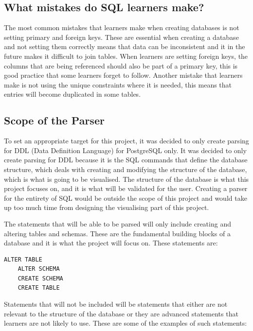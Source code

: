 \subsection{What mistakes do SQL learners make?}

The most common mistakes that learners make when creating databases is not setting primary and foreign keys. These are essential when creating a database and not setting them correctly means that data can be inconsistent and it in the future makes it difficult to join tables. When learners are setting foreign keys, the columns that are being referenced should also be part of a primary key, this is good practice that some learners forget to follow. Another mistake that learners make is not using the unique constraints where it is needed, this means that entries will become duplicated in some tables. 

\subsection{Scope of the Parser}

To set an appropriate target for this project, it was decided to only create parsing for DDL (Data Definition Language) for PostgreSQL only. It was decided to only create parsing for DDL because it is the SQL commands that define the database structure, which deals with creating and modifying the structure of the database, which is what is going to be visualised. The structure of the database is what this project focuses on, and it is what will be validated for the user. Creating a parser for the entirety of SQL would be outside the scope of this project and would take up too much time from designing the visualising part of this project.

The statements that will be able to be parsed will only include creating and altering tables and schemas. These are the fundamental building blocks of a database and it is what the project will focus on. These statements are:

\begin{lstlisting}[style=JavaScript, caption={}]
	ALTER TABLE
	ALTER SCHEMA
	CREATE SCHEMA
	CREATE TABLE
\end{lstlisting}

Statements that will not be included will be statements that either are not relevant to the structure of the database or they are advanced statements that learners are not likely to use. These are some of the examples of such statements:

